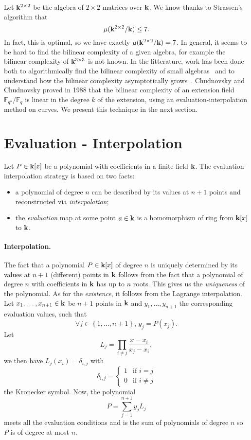 Let $\mathbf{k}^{2\times2}$ be the algebra
of $2\times2$ matrices over $\mathbf{k}$. We know thanks to Strassen's algorithm that
\[
  \mu(\mathbf{k}^{2\times 2}/\mathbf{k}) \leq 7.
\]
In fact, this is optimal, so we have exactly $\mu(\mathbf{k}^{2\times2}/\mathbf{k})=7$. In
general, it seems to be hard to find the bilinear complexity of a given algebra,
for example the bilinear complexity of $\mathbf{k}^{3\times3}$ is not known.
In the litterature, work has been done both to algorithmically find the bilinear complexity of
small algebras~\cite{BDEZ12, Covanov19} and to understand how the bilinear
complexity asymptotically grows~\cite{CC88, BCPRRR19}. Chudnovsky and Chudnovsky
proved in 1988 that the bilinear complexity of an extension field
$\mathbb{F}_{q^k}/\mathbb{F}_{q}$ is linear in the degree $k$ of the
extension, using an evaluation-interpolation method on curves. We present this
technique in the next section.

\section{Evaluation - Interpolation}
\label{sec:evalinter}

Let $P\in\mathbf{k}[x]$ be a polynomial with coefficients in a finite field $\mathbf{k}$. The
evaluation-interpolation strategy is based on two facts:
\begin{itemize}
  \item a polynomial of degree $n$ can be described by its values at $n+1$
    points and reconstructed via \emph{interpolation};
  \item the \emph{evaluation} map at some point $a\in\mathbf{k}$ is a homomorphism of ring from
    $\mathbf{k}[x]$ to $\mathbf{k}$.
\end{itemize}
\paragraph{Interpolation.} The fact that a polynomial $P\in\mathbf{k}[x]$ of degree $n$
is uniquely determined by its values at $n+1$ (different) points in $\mathbf{k}$ follows
from the fact that a polynomial of degree $n$ with coefficients in $\mathbf{k}$ has up
to $n$ roots. This gives us the \emph{uniqueness} of the polynomial. As for the
\emph{existence}, it follows from the Lagrange interpolation. Let $x_1, \dots,
x_{n+1}\in\mathbf{k}$ be $n+1$ points in $\mathbf{k}$ and $y_1, \dots, y_{n+1}$ the
corresponding evaluation values, such that
\[
  \forall j\in\left\{ 1, \dots, n+1 \right\},\,y_j = P(x_j).
\]
Let 
\[
  L_j = \prod_{i\neq j}\frac{x-x_i}{x_j-x_i},
\]
we then have $L_j(x_i) = \delta_{i, j}$ with
\[
  \delta_{i, j} = 
  \left\{\begin{array}{ll}
      1&\mbox{if } i=j\\
      0&\mbox{if } i\neq j
    \end{array}
    \right.
\]
the Kronecker symbol. Now, the polynomial
\[
  P = \sum_{j=1}^{n+1} y_j L_j
\]
meets all the evaluation conditions and is the sum of polynomials of degree $n$
so $P$ is of degree at most $n$.

